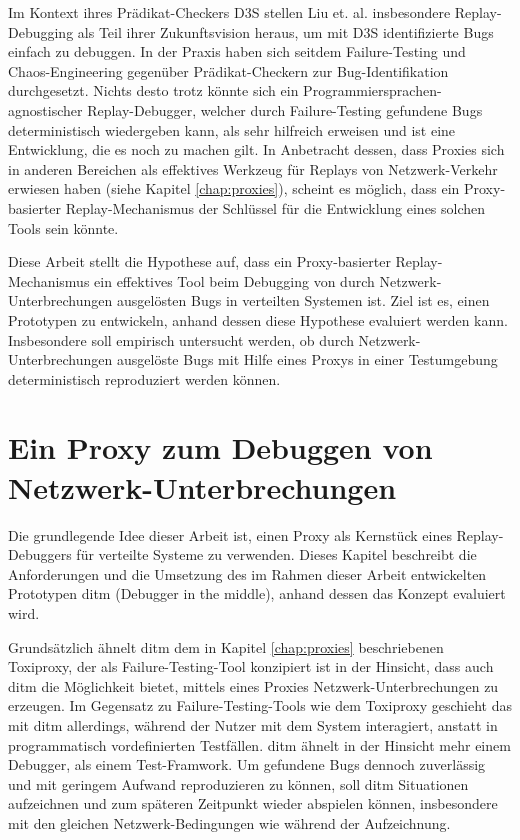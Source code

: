 \documentclass[12pt,a4paper]{report}
\begin{document}
Im Kontext ihres Prädikat-Checkers D3S stellen Liu et. al. \cite{d3s_predicate_checker}
insbesondere Replay-Debugging als Teil ihrer Zukunftsvision heraus, um mit D3S identifizierte Bugs einfach zu debuggen. In der
Praxis haben sich seitdem Failure-Testing und Chaos-Engineering gegenüber Prädikat-Checkern zur Bug-Identifikation durchgesetzt.
Nichts desto trotz könnte sich ein Programmiersprachen-agnostischer Replay-Debugger, welcher durch Failure-Testing gefundene Bugs
deterministisch wiedergeben kann, als sehr hilfreich erweisen und ist eine Entwicklung, die es noch zu machen gilt.
In Anbetracht dessen, dass Proxies sich in anderen Bereichen als effektives Werkzeug für Replays von Netzwerk-Verkehr erwiesen
haben (siehe Kapitel \ref{chap:proxies}), scheint es möglich, dass ein Proxy-basierter Replay-Mechanismus der Schlüssel für die
Entwicklung eines solchen Tools sein könnte.

Diese Arbeit stellt die Hypothese auf, dass ein Proxy-basierter Replay-Mechanismus ein effektives Tool beim Debugging von durch
Netzwerk-Unterbrechungen ausgelösten Bugs in verteilten Systemen ist. Ziel ist es, einen Prototypen zu entwickeln, anhand dessen
diese Hypothese evaluiert werden kann. Insbesondere soll empirisch untersucht werden, ob durch Netzwerk-Unterbrechungen ausgelöste
Bugs mit Hilfe eines Proxys in einer Testumgebung deterministisch reproduziert werden können.



\chapter{Ein Proxy zum Debuggen von Netzwerk-Unterbrechungen}
\label{chap:system}
% 
Die grundlegende Idee dieser Arbeit ist, einen Proxy als Kernstück eines Replay-Debuggers für verteilte Systeme zu verwenden.
Dieses Kapitel beschreibt die Anforderungen und die Umsetzung des im Rahmen dieser Arbeit entwickelten Prototypen ditm (Debugger
in the middle), anhand dessen das Konzept evaluiert wird.

Grundsätzlich ähnelt ditm dem in Kapitel \ref{chap:proxies} beschriebenen Toxiproxy, der als Failure-Testing-Tool konzipiert ist
in der Hinsicht, dass auch ditm die Möglichkeit bietet, mittels eines Proxies Netzwerk-Unterbrechungen zu erzeugen. Im Gegensatz
zu Failure-Testing-Tools wie dem Toxiproxy geschieht das mit ditm allerdings, während der Nutzer mit dem System interagiert,
anstatt in programmatisch vordefinierten Testfällen. ditm ähnelt in der Hinsicht mehr einem Debugger, als einem Test-Framwork. Um
gefundene Bugs dennoch zuverlässig und mit geringem Aufwand reproduzieren zu können, soll ditm Situationen aufzeichnen und zum
späteren Zeitpunkt wieder abspielen können, insbesondere mit den gleichen Netzwerk-Bedingungen wie während der Aufzeichnung.
\end{document}

